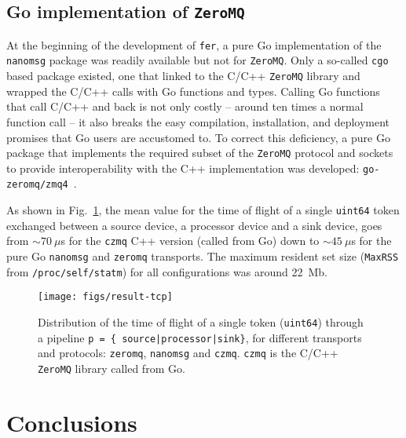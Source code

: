 \documentclass{webofc}
\begin{document}
\subsection{Go implementation of \texttt{ZeroMQ}}

At the beginning of the development of \texttt{fer}, a pure Go implementation of the \texttt{nanomsg} package was readily available but not for \texttt{ZeroMQ}.
Only a so-called \texttt{cgo} based package existed, one that linked to the C/C++ \texttt{ZeroMQ} library and wrapped the C/C++ calls with Go functions and types.
Calling Go functions that call C/C++ and back is not only costly -- around ten times a normal function call -- it also breaks the easy compilation, installation, and deployment promises that Go users are accustomed to.
To correct this deficiency, a pure Go package that implements the required subset of the \texttt{ZeroMQ} protocol and sockets to provide interoperability with the C++ implementation was developed: \texttt{go-zeromq/zmq4}~\cite{ref-go-zmq}.

As shown in Fig.~\ref{fig-tof-tcp}, the mean value for the time of flight of a single \texttt{uint64} token exchanged between a source device, a processor device and a sink device, goes from $\sim 70~\mu$s for the \texttt{czmq} C++ version (called from Go) down to $\sim 45~\mu$s for the pure Go \texttt{nanomsg} and \texttt{zeromq} transports.
The maximum resident set size (\texttt{MaxRSS} from \texttt{/proc/self/statm}) for all configurations was around 22~Mb.

\begin{figure}[h]
\centering
\texttt{[image: figs/result-tcp]}
	\caption{Distribution of the time of flight of a single token (\texttt{uint64}) through a pipeline \texttt{p = \{ source|processor|sink\}}, for different transports and protocols: \texttt{zeromq}, \texttt{nanomsg} and \texttt{czmq}.
	\texttt{czmq} is the C/C++ \texttt{ZeroMQ} library called from Go.}
\label{fig-tof-tcp}
\end{figure}

\section{Conclusions}
\label{sec-conclusions}
\end{document}
